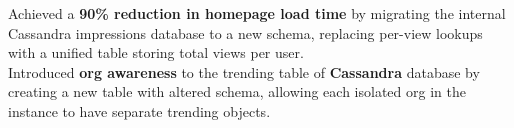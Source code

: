 \documentclass[]{Nikhil_Kadiyan_Resume}
\begin{document}
\pt Achieved a \textbf{90\% reduction in homepage load time} by migrating the internal Cassandra impressions database to a new schema, replacing per-view lookups with a unified table storing total views per user.\\
\pt Introduced \textbf{org awareness} to the trending table of \textbf{Cassandra} database by creating a new table with altered schema, allowing each isolated org in the instance to have separate trending objects.\\
\end{document}
